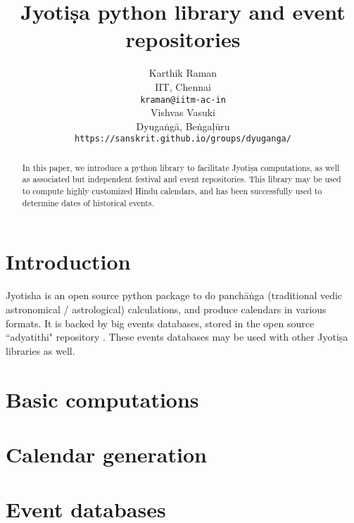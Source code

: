 \documentclass[11pt]{article}
\title{Jyotiṣa python library and event repositories}
\author{Karthik Raman \\
  IIT, Chennai \\
  {\tt kraman@iitm·ac·in} \\\And
  Vishvas Vasuki \\
  Dyugaṅgā, Beṅgaḷūru \\
  {\tt https://sanskrit.github.io/groups/dyuganga/}
\\}
\date{}
\begin{document}
\maketitle
\begin{abstract}
In this paper, we introduce a python library to facilitate Jyotiṣa computations, as well as associated but independent festival and event repositories. This library may be used to compute highly customized Hindu calendars, and has been successfully used to determine dates of historical events.
\end{abstract}

\section{Introduction}
Jyotisha \cite{jyotisha_py} is an open source python package to do panchāṅga (traditional vedic astronomical / astrological) calculations, and produce calendars in various formats. It is backed by big events databases, stored in the open source ``adyatithi" repository \cite{adyatithi}. These events databases may be used with other Jyotiṣa libraries as well.

\section{Basic computations}

\section{Calendar generation}

\section{Event databases}





\end{document}
